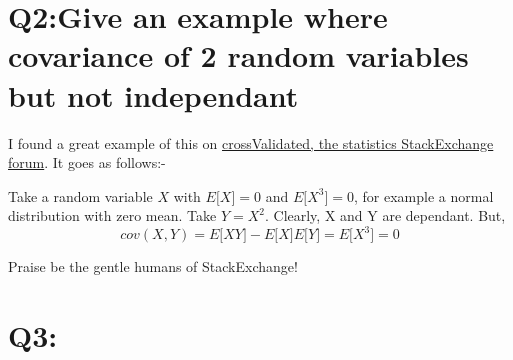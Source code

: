\documentclass[]{article}
\begin{document}
\section{Q2:Give an example where covariance of 2 random variables but not independant}

I found a great example of this on \href{http://stats.stackexchange.com/questions/12842/covariance-and-independence}{crossValidated, the statistics StackExchange forum}. It goes as follows:-

Take a random variable $X$ with $E\big[X\big]=0$ and $E\big[X^3\big]=0$, for example a normal distribution with zero mean. Take $Y=X^2$. Clearly, X and Y are dependant. But,
\begin{equation}
cov(X,Y)=E\big[XY\big]-E\big[X\big]E\big[Y\big]=E\big[X^3\big]=0
\end{equation} 

Praise be the gentle humans of StackExchange!

\section{Q3:}
\end{document}
